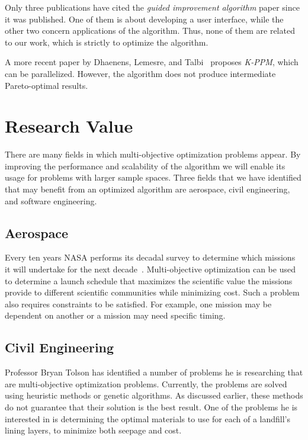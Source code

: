 \documentclass[11pt]{article}
\begin{document}
Only three publications have cited the \textit{guided improvement
algorithm} paper since it was published. One of them is about
developing a user interface, while the other two concern applications
of the algorithm. Thus, none of them are related to our work, which is
strictly to optimize the algorithm.

A more recent paper by Dhaenens, Lemesre, and Talbi~\cite{ref:kppm}
proposes \textit{\mbox{K-PPM}}, which can be parallelized. However, the
algorithm does not produce intermediate Pareto-optimal results.

\section{Research Value}
There are many fields in which multi-objective optimization problems
appear. By improving the performance and scalability of the algorithm
we will enable its usage for problems with larger sample spaces. Three
fields that we have identified that may benefit from an optimized
algorithm are aerospace, civil engineering, and software engineering.

\subsection{Aerospace}
Every ten years NASA performs its decadal survey to determine which
missions it will undertake for the next decade~\cite{ref:decadal}.
Multi-objective optimization can be used to determine a launch schedule
that maximizes the scientific value the missions provide to different
scientific communities while minimizing cost. Such a problem also
requires constraints to be satisfied. For example, one mission may be
dependent on another or a mission may need specific timing.

\subsection{Civil Engineering}
Professor Bryan Tolson has identified a number of problems he is
researching that are multi-objective optimization problems. Currently,
the problems are solved using heuristic methods or genetic algorithms.
As discussed earlier, these methods do not guarantee that their
solution is the best result. One of the problems he is interested in is
determining the optimal materials to use for each of a landfill's
lining layers, to minimize both seepage and cost.
\end{document}
